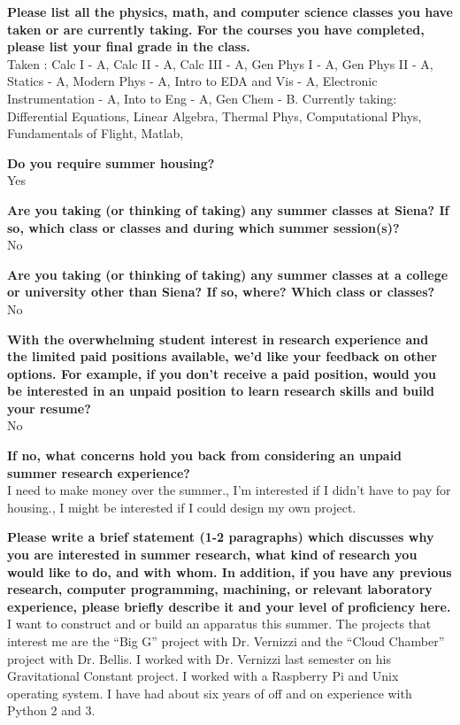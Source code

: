 \documentclass[12pt,preprint]{aastex}
\begin{document}
 \vspace*{1mm}
{\bf Please list all the physics, math, and computer science classes you have taken or are currently taking.  For the courses you have completed, please list your final grade in the class.}\\
Taken : Calc I - A, Calc II - A, Calc III - A, Gen Phys I - A, Gen Phys II - A, Statics - A, Modern Phys - A,  Intro to EDA and Vis - A, Electronic Instrumentation - A, Into to Eng - A, Gen Chem - B. Currently taking: Differential Equations, Linear Algebra, Thermal Phys, Computational Phys, Fundamentals of Flight, Matlab, 

\vspace*{3mm}
{\bf Do you require summer housing?}\\
Yes

\vspace*{3mm}
{\bf Are you taking (or thinking of taking) any summer classes at Siena?  If so, which class or classes and during which summer session(s)?}\\
No

\vspace*{3mm}
{\bf Are you taking (or thinking of taking) any summer classes at a college or university other than Siena?  If so, where?  Which class or classes?}\\
No

\vspace*{3mm}
{\bf With the overwhelming student interest in research experience and the limited paid positions available, we'd like your feedback on other options.  For example, if you don't receive a paid position, would you be interested in an unpaid position to learn research skills and build your resume?}\\
No

\vspace*{3mm}
{\bf If no, what concerns hold you back from considering an unpaid summer research experience?}\\
I need to make money over the summer., I'm interested if I didn't have to pay for housing., I might be interested if I could design my own project.

\vspace*{3mm}
{\bf Please write a brief statement (1-2 paragraphs) which discusses why you are interested in summer research, what kind of research you would like to do, and with whom.  In addition, if you have any previous research, computer programming, machining, or relevant laboratory experience, please briefly describe it and your level of proficiency here.}\\
I want to construct and or build an apparatus this summer. The projects that interest me are the “Big G” project with Dr. Vernizzi  and the “Cloud Chamber” project with Dr. Bellis.    I worked with Dr. Vernizzi last semester on his Gravitational Constant project. I worked with a Raspberry Pi and Unix operating system. I have had about six years of off and on experience with Python 2 and 3.      
\end{document}
